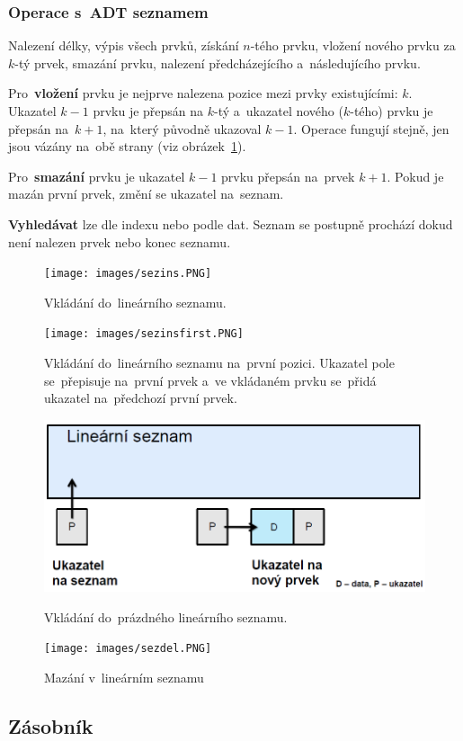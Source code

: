 \subsubsection{Operace s~ADT seznamem}

Nalezení délky, výpis všech prvků, získání \( n \)-tého prvku, vložení nového prvku za \( k \)-tý prvek, smazání prvku, nalezení předcházejícího a~následujícího prvku.

Pro~\textbf{vložení} prvku je nejprve nalezena pozice mezi prvky existujícími: \( k \). Ukazatel \( k-1 \) prvku je přepsán na \( k \)-tý a~ukazatel nového (\( k \)-tého) prvku je přepsán na~\( k+1 \), na~který původně ukazoval \( k-1 \). Operace fungují stejně, jen jsou vázány na~obě strany (viz obrázek~\ref{sezins}).

Pro~\textbf{smazání} prvku je ukazatel \( k-1 \) prvku přepsán na~prvek \( k+1 \). Pokud je mazán první prvek, změní se ukazatel na~seznam.

\textbf{Vyhledávat} lze dle indexu nebo podle dat. Seznam se postupně prochází dokud není nalezen prvek nebo konec seznamu.

\begin{figure}[ht]
	\centering
	\texttt{[image: images/sezins.PNG]}
	\caption{Vkládání do~lineárního seznamu.}
	\label{sezins}

	\texttt{[image: images/sezinsfirst.PNG]}
	\caption{Vkládání do~lineárního seznamu na~první pozici. Ukazatel pole se~přepisuje na~první prvek a~ve vkládaném prvku se~přidá ukazatel na~předchozí první prvek.}

	\includegraphics[scale=0.5]{images/sezinsempty.PNG}
	\caption{Vkládání do~prázdného lineárního seznamu.}

	\texttt{[image: images/sezdel.PNG]}
	\caption{Mazání v~lineárním seznamu}
\end{figure}

\subsection{Zásobník}

